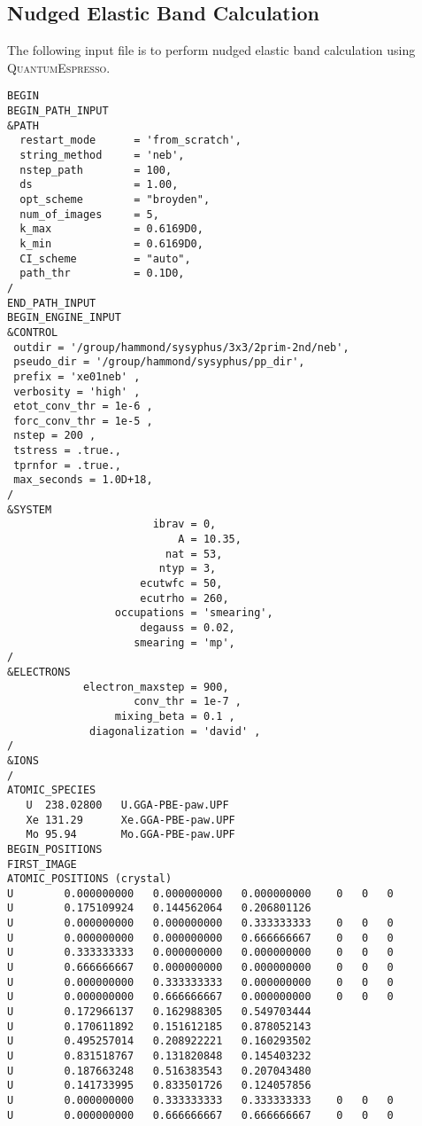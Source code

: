\subsection{Nudged Elastic Band Calculation}
The following input file is to perform nudged elastic band calculation using \mbox{\textsc{QuantumEspresso}}.
\lstset{style=atpw}
\begin{lstlisting}
BEGIN
BEGIN_PATH_INPUT
&PATH
  restart_mode      = 'from_scratch',
  string_method     = 'neb',
  nstep_path        = 100,
  ds                = 1.00,
  opt_scheme        = "broyden",
  num_of_images     = 5,
  k_max             = 0.6169D0,
  k_min             = 0.6169D0,
  CI_scheme         = "auto",
  path_thr          = 0.1D0,
/
END_PATH_INPUT
BEGIN_ENGINE_INPUT
&CONTROL
 outdir = '/group/hammond/sysyphus/3x3/2prim-2nd/neb',
 pseudo_dir = '/group/hammond/sysyphus/pp_dir',
 prefix = 'xe01neb' ,
 verbosity = 'high' ,
 etot_conv_thr = 1e-6 ,
 forc_conv_thr = 1e-5 ,
 nstep = 200 ,
 tstress = .true.,
 tprnfor = .true.,
 max_seconds = 1.0D+18,
/
&SYSTEM
                       ibrav = 0,
                           A = 10.35,
                         nat = 53, 
                        ntyp = 3,
                     ecutwfc = 50, 
                     ecutrho = 260,
                 occupations = 'smearing',
                     degauss = 0.02,
                    smearing = 'mp',
/
&ELECTRONS
            electron_maxstep = 900,
                    conv_thr = 1e-7 ,
                 mixing_beta = 0.1 ,
             diagonalization = 'david' ,
/
&IONS
/
ATOMIC_SPECIES
   U  238.02800   U.GGA-PBE-paw.UPF
   Xe 131.29      Xe.GGA-PBE-paw.UPF
   Mo 95.94       Mo.GGA-PBE-paw.UPF
BEGIN_POSITIONS
FIRST_IMAGE
ATOMIC_POSITIONS (crystal)
U        0.000000000   0.000000000   0.000000000    0   0   0
U        0.175109924   0.144562064   0.206801126
U        0.000000000   0.000000000   0.333333333    0   0   0
U        0.000000000   0.000000000   0.666666667    0   0   0
U        0.333333333   0.000000000   0.000000000    0   0   0
U        0.666666667   0.000000000   0.000000000    0   0   0
U        0.000000000   0.333333333   0.000000000    0   0   0
U        0.000000000   0.666666667   0.000000000    0   0   0
U        0.172966137   0.162988305   0.549703444
U        0.170611892   0.151612185   0.878052143
U        0.495257014   0.208922221   0.160293502
U        0.831518767   0.131820848   0.145403232
U        0.187663248   0.516383543   0.207043480
U        0.141733995   0.833501726   0.124057856
U        0.000000000   0.333333333   0.333333333    0   0   0
U        0.000000000   0.666666667   0.666666667    0   0   0

\end{lstlisting}
